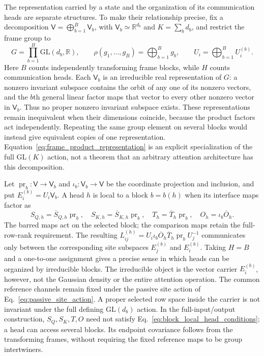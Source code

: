\documentclass[twoside,11pt]{article}
\begin{document}
The representation carried by a state and the organization of its communication heads are separate structures. To make their relationship precise, fix a decomposition $\mathsf V=\bigoplus_{b=1}^{B}\mathsf V_b$, with $\mathsf V_b\simeq\mathbb R^{d_b}$ and $K=\sum_bd_b$, and restrict the frame group to
\begin{equation}
G=\prod_{b=1}^{B}\mathrm{GL}(d_b,\mathbb R),\qquad
\rho(g_1,\ldots,g_B)=\bigoplus_{b=1}^{B}g_b,\qquad
U_i=\bigoplus_{b=1}^{B}U_i^{(b)}.
\label{eq:frame_product_representation}
\end{equation}
Here $B$ counts independently transforming frame blocks, while $H$ counts communication heads. Each $\mathsf V_b$ is an irreducible real representation of $G$: a nonzero invariant subspace contains the orbit of any one of its nonzero vectors, and the $b$th general linear factor maps that vector to every other nonzero vector in $\mathsf V_b$. Thus no proper nonzero invariant subspace exists. These representations remain inequivalent when their dimensions coincide, because the product factors act independently. Repeating the same group element on several blocks would instead give equivalent copies of one representation. Equation~\eqref{eq:frame_product_representation} is an explicit specialization of the full $\mathrm{GL}(K)$ action, not a theorem that an arbitrary attention architecture has this decomposition.

Let $\operatorname{pr}_b:\mathsf V\to\mathsf V_b$ and $\iota_b:\mathsf V_b\to\mathsf V$ be the coordinate projection and inclusion, and put $E_i^{(b)}=U_i\mathsf V_b$. A head $h$ is local to a block $b=b(h)$ when its interface maps factor as
\begin{equation}
S_{Q,h}=\overline S_{Q,h}\operatorname{pr}_b,\quad
S_{K,h}=\overline S_{K,h}\operatorname{pr}_b,\quad
T_h=\overline T_h\operatorname{pr}_b,\quad
O_h=\iota_b\overline O_h.
\label{eq:block_local_head_conditions}
\end{equation}
The barred maps act on the selected block; the comparison maps retain the full-row-rank requirement. The resulting $L_{ij}^{(h)}=U_i\iota_b\overline O_h\overline T_h\operatorname{pr}_bU_j^{-1}$ communicates only between the corresponding site subspaces $E_j^{(b)}$ and $E_i^{(b)}$. Taking $H=B$ and a one-to-one assignment gives a precise sense in which heads can be organized by irreducible blocks. The irreducible object is the vector carrier $E_i^{(b)}$, however, not the Gaussian density or the entire attention operation. The common reference channels remain fixed under the passive site action of Eq.~\eqref{eq:passive_site_action}. A proper selected row space inside the carrier is not invariant under the full defining $\mathrm{GL}(d_b)$ action. In the full-input/output construction, $S_Q,S_K,T,O$ need not satisfy Eq.~\eqref{eq:block_local_head_conditions}; a head can access several blocks. Its endpoint covariance follows from the transforming frames, without requiring the fixed reference maps to be group intertwiners.
\end{document}
